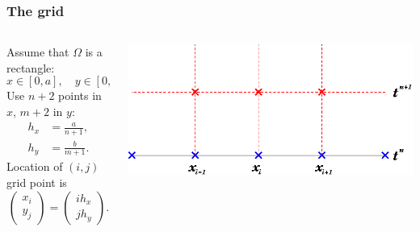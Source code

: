 \documentclass{beamer}
\begin{document}
\begin{frame}
  \frametitle{The grid}

  \begin{columns}
    \begin{column}{0.5\textwidth}
      Assume that $\Omega$ is a rectangle:
      \begin{equation*}
        x \in [0,a], \quad y \in [0, b].
      \end{equation*}
      Use $n+2$ points in $x$, $m+2$ in $y$:
      \begin{align*}
        h_x & = \frac{a}{n + 1}, \\
        h_y & = \frac{b}{m + 1}.
      \end{align*}
      Location of $(i,j)$ grid point is
      \begin{equation*}
        \begin{pmatrix}
          x_{i} \\ y_{j}
        \end{pmatrix} =
        \begin{pmatrix}
          i h_x \\ j h_y
        \end{pmatrix}.
      \end{equation*}
    \end{column}
    \begin{column}{0.5\textwidth}
      \begin{center}
        \includegraphics[width=\textwidth]{figures/Grid1}
      \end{center}
    \end{column}
  \end{columns}

\end{frame}
\end{document}
